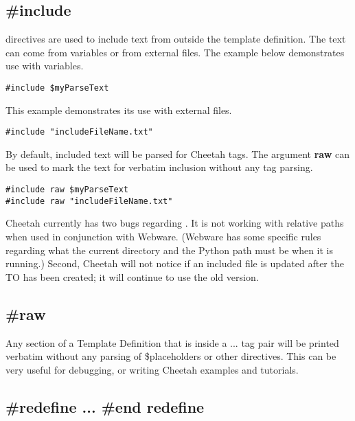 {\subsection{\#include}

 directives are used to include text from outside the template
definition.  The text can come from  variables or from
external files.  The example below demonstrates use with 
variables.

\begin{verbatim}
#include $myParseText
\end{verbatim}

This example demonstrates its use with external files.
\begin{verbatim}
#include "includeFileName.txt"
\end{verbatim}

By default, included text will be parsed for Cheetah tags.  The argument
{\bf raw} can be used to mark the text for verbatim inclusion without any tag
parsing.

\begin{verbatim}
#include raw $myParseText
#include raw "includeFileName.txt"
\end{verbatim}

Cheetah currently has two bugs regarding .  It is not working
with relative paths when used in conjunction with Webware.  (Webware has some
specific rules regarding what the current directory and the Python path must be
when it is running.)  Second, Cheetah will not notice if an included file is
updated after the TO has been created; it will continue to use the old version.

\subsection{\#raw}
Any section of a Template Definition that is inside a  ...
 tag pair will be printed verbatim without any parsing of
\$placeholders or other directives.  This can be very useful for debugging, or
writing Cheetah examples and tutorials.


\subsection{\#redefine ... \#end redefine}

}
